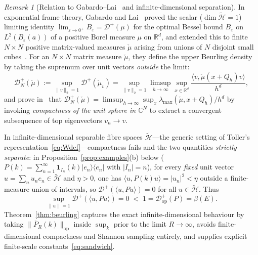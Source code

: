 \documentclass[11pt,a4paper]{article}
\theoremstyle{definition}
\theoremstyle{remark}
\newtheorem{remark}[theorem]{Remark}
\newcommand{\tH}{\widetilde{\mathcal{H}}}
\newcommand{\RR}{\mathbb{R}}
\newcommand{\CC}{\mathbb{C}}
\newcommand{\op}{\mathrm{op}}
\newcommand{\one}{\mathbf{1}}
\newcommand{\ket}[1]{|#1\rangle}
\newcommand{\bra}[1]{\langle #1|}
\newcommand{\ip}[2]{\langle #1, #2 \rangle}
\newcommand{\norm}[1]{\|#1\|}
\begin{document}
\begin{remark}[Relation to Gabardo--Lai~\cite{GabardoLai2016} and infinite-dimensional separation]\label{rem:gl-sep}
In exponential frame theory, Gabardo and Lai~\cite[Thm.~1, Cor.~3]{GabardoLai2016} proved the scalar ($\dim\tH=1$) limiting identity $\lim_{\varepsilon\to 0^+} B_\varepsilon = \mathcal{D}^+(\mu)$ for the optimal Bessel bound $B_\varepsilon$ on $L^2(B_\varepsilon(a))$ of a positive Borel measure $\mu$ on $\RR^d$, and extended this to finite $N\times N$ positive matrix-valued measures $\check\mu$ arising from unions of $N$ disjoint small cubes~\cite[Thms.~14--15, Cor.~16]{GabardoLai2016}. For an $N\times N$ matrix measure $\check\mu$, they define the upper Beurling density by taking the supremum over unit vectors \emph{outside} the limit:
\[
\mathcal{D}_N^+(\check\mu) := \sup_{\norm{v}_2=1} \mathcal{D}^+(\check\mu_v)
= \sup_{\norm{v}_2=1} \limsup_{h\to\infty}\sup_{x\in\RR^d} \frac{\ip{v}{\check\mu(x+Q_h)v}}{h^d},
\]
and prove in~\cite[Lem.~9]{GabardoLai2016} that $\mathcal{D}_N^+(\check\mu) = \limsup_{h\to\infty}\sup_x \lambda_{\max}(\check\mu, x+Q_h)/h^d$ by invoking \emph{compactness of the unit sphere in $\CC^N$} to extract a convergent subsequence of top eigenvectors $v_n\to v$.

In infinite-dimensional separable fibre spaces $\tH$---the generic setting of Toller's representation~\eqref{eq:Wdef}---compactness fails and the two quantities \emph{strictly separate}: in Proposition~\ref{prop:examples}(b) below ($P(k)=\sum_{n=1}^\infty \one_{I_n}(k)\ket{e_n}\bra{e_n}$ with $|I_n|=n$), for every \emph{fixed} unit vector $u=\sum_n u_n e_n\in\tH$ and $\eta>0$, one has $\ip{u}{P(k)u}=|u_n|^2<\eta$ outside a finite-measure union of intervals, so $\mathcal{D}^+(\ip{u}{Pu})=0$ for all $u\in\tH$. Thus
\[
\sup_{\norm{u}=1}\mathcal{D}^+(\ip{u}{Pu}) = 0 \;<\; 1 = \mathcal{D}_{\op}^+(P) = \beta(E).
\]
Theorem~\ref{thm:beurling} captures the exact infinite-dimensional behaviour by taking $\norm{\overline{P}_R(k)}_{\op}$ inside $\sup_k$ prior to the limit $R\to\infty$, avoids finite-dimensional compactness and Shannon sampling entirely, and supplies explicit finite-scale constants~\eqref{eq:sandwich}.
\end{remark}
\end{document}
